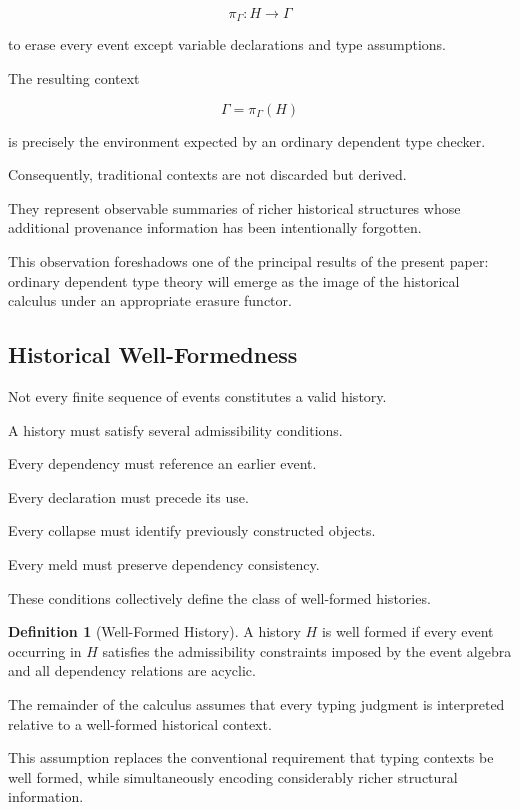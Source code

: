 \documentclass[12pt,oneside]{article}
\theoremstyle{definition}
\newtheorem{definition}[theorem]{Definition}
\theoremstyle{remark}
\begin{document}
\[
\pi_{\Gamma}
:
H
\rightarrow
\Gamma
\]

to erase every event except variable declarations and type assumptions.

The resulting context

\[
\Gamma
=
\pi_{\Gamma}(H)
\]

is precisely the environment expected by an ordinary dependent type checker.

Consequently, traditional contexts are not discarded but derived.

They represent observable summaries of richer historical structures whose
additional provenance information has been intentionally forgotten.

This observation foreshadows one of the principal results of the present paper:
ordinary dependent type theory will emerge as the image of the historical
calculus under an appropriate erasure functor.

\subsection{Historical Well-Formedness}

Not every finite sequence of events constitutes a valid history.

A history must satisfy several admissibility conditions.

Every dependency must reference an earlier event.

Every declaration must precede its use.

Every collapse must identify previously constructed objects.

Every meld must preserve dependency consistency.

These conditions collectively define the class of well-formed histories.

\begin{definition}[Well-Formed History]

A history \(H\) is well formed if every event occurring in \(H\) satisfies the
admissibility constraints imposed by the event algebra and all dependency
relations are acyclic.

\end{definition}

The remainder of the calculus assumes that every typing judgment is interpreted
relative to a well-formed historical context.

This assumption replaces the conventional requirement that typing contexts be
well formed, while simultaneously encoding considerably richer structural
information.
\end{document}
